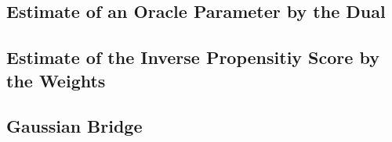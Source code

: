 \documentclass[11pt, a4paper, BCOR=10mm, DIV=11]{scrbook}
\theoremstyle{definition}
\theoremstyle{plain}
\begin{document}
  \subsection{Estimate of an Oracle Parameter by the Dual}
  
  \subsection{Estimate of the Inverse Propensitiy Score by the Weights}
  
%  
%  
%  
%
%  
%  
%  
  \subsection*{Gaussian Bridge}
  
  
\end{document}
